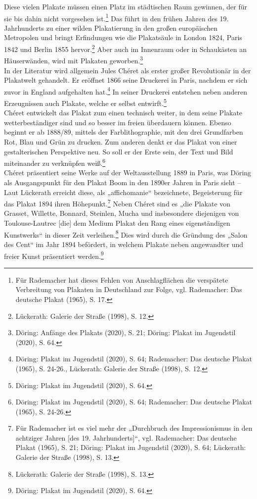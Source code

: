\documentclass[a4paper,12pt,ngerman]{article}
\begin{document}
Diese vielen Plakate müssen einen Platz im städtischen Raum gewinnen, der für sie bis dahin nicht vorgesehen ist.\footnote{Für Rademacher hat dieses Fehlen von Anschlagflächen die verspätete Verbreitung von Plakaten in Deutschland zur Folge, vgl. Rademacher: Das deutsche Plakat (1965), S. 17.}  Das führt in den frühen Jahren des 19. Jahrhunderts zu einer wilden Plakatierung in den großen europäischen Metropolen und bringt Erfindungen wie die Plakatsäule in London 1824, Paris 1842 und Berlin 1855 hervor.\footnote{Lückerath: Galerie der Straße (1998), S. 12.}  Aber auch im Innenraum oder in Schaukästen an Häuserwänden, wird mit Plakaten geworben.\footnote{Döring: Anfänge des Plakats (2020), S. 21; Döring: Plakat im Jugendstil (2020), S. 64.} \\
In der Literatur wird allgemein Jules Chéret als erster großer Revolutionär in der Plakatwelt gehandelt. Er eröffnet 1866 seine Druckerei in Paris, nachdem er sich zuvor in England aufgehalten hat.\footnote{Döring: Plakat im Jugendstil (2020), S. 64; Rademacher: Das deutsche Plakat (1965), S. 24-26., Lückerath: Galerie der Straße (1998), S. 12.}  In seiner Druckerei entstehen neben anderen Erzeugnissen auch Plakate, welche er selbst entwirft.\footnote{Döring: Plakat im Jugendstil (2020), S. 64.} \\
Chéret entwickelt das Plakat zum einen technisch weiter, in dem seine Plakate wetterbeständiger sind und so besser im freien überdauern können. Ebenso beginnt er ab 1888/89, mittels der Farblithographie, mit den drei Grundfarben Rot, Blau und Grün zu drucken. Zum anderen denkt er das Plakat von einer gestalterischen Perspektive neu. So soll er der Erste sein, der Text und Bild miteinander zu verknüpfen weiß.\footnote{Döring: Plakat im Jugendstil (2020), S. 64; Rademacher: Das deutsche Plakat (1965), S. 24-26.} \\
Chéret präsentiert seine Werke auf der Weltausstellung 1889 in Paris, was Döring als Ausgangspunkt für den Plakat Boom in den 1890er Jahren in Paris sieht -- Laut Lückerath erreicht diese, als „affichomanie“ bezeichnete, Begeisterung für das Plakat 1894 ihren Höhepunkt.\footnote{Für Rademacher ist es viel mehr der „Durchbruch des Impressionismus in den achtziger Jahren [des 19. Jahrhunderts]“, vgl. Rademacher: Das deutsche Plakat (1965), S. 21; Döring: Plakat im Jugendstil (2020), S. 64; Lückerath: Galerie der Straße (1998), S. 13.}  Neben Chéret sind es „die Plakate von Grasset, Willette, Bonnard, Steinlen, Mucha und insbesondere diejenigen von Toulouse-Lautrec [die] dem Medium Plakat den Rang eines eigenständigen Kunstwerks“ in dieser Zeit verleihen.\footnote{Lückerath: Galerie der Straße (1998), S. 13.}  Dies wird durch die Gründung des „Salon des Cent“ im Jahr 1894 befördert, in welchem Plakate neben angewandter und freier Kunst präsentiert werden.\footnote{Döring: Plakat im Jugendstil (2020), S. 64.} \\
\end{document}
